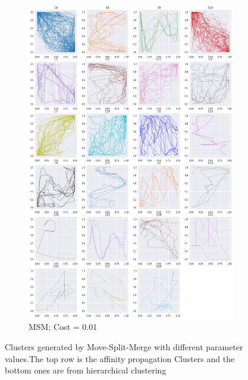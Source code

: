 \begin{figure}[h]
\begin{subfigure}[c]{0.35\linewidth}
      \includegraphics[width=\linewidth]{figs/clusters/CLU_H_ALL[MSM;c=.01].png}
    \caption{MSM; Cost = 0.01}
  \end{subfigure}
  
  \caption{Clusters generated by Move-Split-Merge with different parameter values.The top row is the affinity propagation Clusters and the bottom ones are from hierarchical clustering}
  \label{fig:cluster-msm}
\end{figure}


